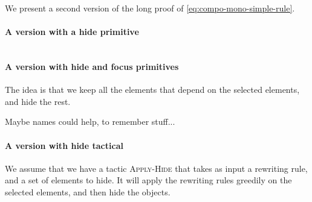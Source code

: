 \documentclass{article}
\begin{document}
We present a second version of the long proof of \eqref{eq:compo-mono-simple-rule}.
\pagebreak
\[

\]
\paragraph{A version with a hide primitive}
\pagebreak
\[

\]
\paragraph{A version with hide and focus primitives}
The idea is that we keep all the elements that depend on the selected elements, and hide the rest.
\pagebreak
\[

\]

Maybe names could help, to remember stuff...
\paragraph{A version with hide tactical}
We assume that we have a tactic \textsc{Apply-Hide} that takes as input 
a rewriting rule, and a set of elements to hide.
It will apply the rewriting rules greedily on the selected elements,
and then hide the objects.
\[

\]
\end{document}

